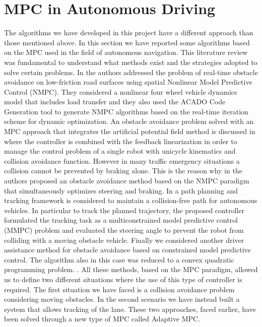 \section{MPC in Autonomous Driving}
The algorithms we have developed in this project have a different approach than those mentioned above. In this section we have reported some algorithms based on the MPC used in the field of autonomous navigation. This literature review was fundamental to understand what methods exist and the strategies adopted to solve certain problems.
In \cite{Frasch2013} the authors addressed the problem of real-time obstacle avoidance on low-friction road surfaces using spatial Nonlinear Model Predictive Control (NMPC). They considered a nonlinear four wheel vehicle dynamics model that includes load transfer and they also used the ACADO Code Generation tool to generate NMPC algorithms based on the real-time iteration scheme for dynamic optimization. An obstacle avoidance problem solved with an MPC approach that integrates the artificial potential field method is discussed in \cite{Manzoor2015} where the controller is combined with the feedback linearization in order to manage the control problem of a single robot with unicycle kinematics and collision avoidance function. However in many traffic emergency situations a collision cannot be prevented by braking alone. This is the reason why in \cite{Werling2012} the authors proposed an obstacle avoidance method based on the NMPC paradigm that simultaneously optimizes steering and braking. In \cite{Multi2017} a path planning and tracking framework is considered to maintain a collision-free path for autonomous vehicles. In particular to track the planned
trajectory, the proposed controller formulated the tracking task as a multiconstrained model predictive control (MMPC) problem and evaluated the steering angle to prevent the robot  from colliding with a moving obstacle vehicle. Finally we considered another driver assistance method for obstacle avoidance based on constrained model predictive control. The algorithm also in this case was reduced to a convex quadratic programming problem. \cite{Wada2017}. All these methods, based on the MPC paradigm, allowed us to define two different situations where the use of this type of controller is required. The first situation we have faced is a collision avoidance problem considering moving obstacles. In the second scenario we have instead built a system that allows tracking of the lane. These two approaches, faced earlier, have been solved through a new type of MPC called Adaptive MPC.